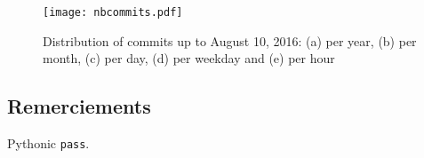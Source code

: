 \begin{figure}[htbp]
\centering
\texttt{[image: nbcommits.pdf]}
\caption{Distribution of commits up to August 10, 2016: (a) per year, (b) per month, (c) per day, (d) per weekday and (e) per hour} \label{fig:nbcommits}
\end{figure}

\subsection*{Remerciements}
Pythonic \texttt{pass}.